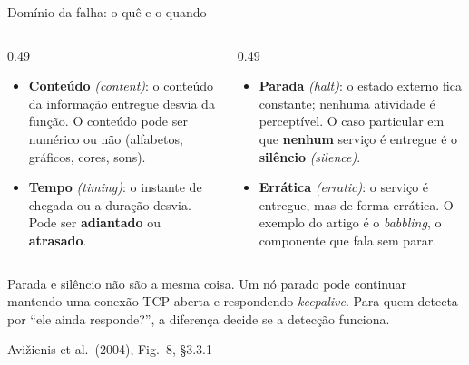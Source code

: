 \documentclass{beamer}
\newcommand{\en}[1]{{\color{depCinza}\textit{#1}}}
\newcommand{\sect}[1]{\par\smallskip\hfill{\tiny\color{black!55}Avi\v{z}ienis et al.\ (2004), #1}}
\begin{document}
\begin{frame}{Dom\'inio da falha: o qu\^e e o quando}
    \centering
    \diagDominioFalha
    \vspace{0.1em}
    \scriptsize
    \begin{columns}[T]
        \begin{column}{0.49\textwidth}
            \begin{itemize}
                \item \textbf{Conte\'udo} \en{(content)}: o conte\'udo da informa\c{c}\~ao entregue desvia da fun\c{c}\~ao. O conte\'udo pode ser num\'erico ou n\~ao (alfabetos, gr\'aficos, cores, sons).
                \item \textbf{Tempo} \en{(timing)}: o instante de chegada ou a dura\c{c}\~ao desvia. Pode ser \textbf{adiantado} ou \textbf{atrasado}.
            \end{itemize}
        \end{column}
        \begin{column}{0.49\textwidth}
            \begin{itemize}
                \item \textbf{Parada} \en{(halt)}: o estado externo fica constante; nenhuma atividade \'e percept\'ivel. O caso particular em que \textbf{nenhum} servi\c{c}o \'e entregue \'e o \textbf{sil\^encio} \en{(silence)}.
                \item \textbf{Err\'atica} \en{(erratic)}: o servi\c{c}o \'e entregue, mas de forma err\'atica. O exemplo do artigo \'e o \textit{babbling}, o componente que fala sem parar.
            \end{itemize}
        \end{column}
    \end{columns}
    \smallskip
    \begin{armadilha}
        \scriptsize
        Parada e sil\^encio n\~ao s\~ao a mesma coisa. Um n\'o parado pode continuar mantendo uma conex\~ao TCP aberta e respondendo \textit{keepalive}. Para quem detecta por ``ele ainda responde?'', a diferen\c{c}a decide se a detec\c{c}\~ao funciona.
    \end{armadilha}
    \sect{Fig.\ 8, \S3.3.1}
\end{frame}
\end{document}
